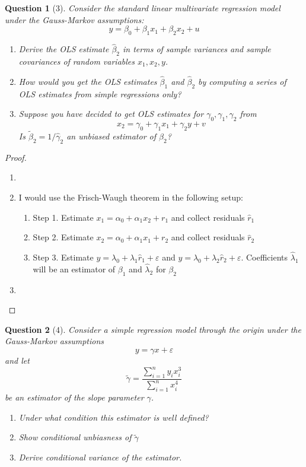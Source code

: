 \documentclass[12pt,reqno]{amsart}
\theoremstyle{plain}
\newcommand{\hb}{\hat\beta}
\newcommand{\tb}{\tilde\beta}
\newtheorem*{theorem*}{Question}
\begin{document}
\begin{theorem*}[3]
    \normalfont
    Consider the standard linear multivariate regression model under the Gauss-Markov assumptions:
    \[y = \beta_0 + \beta_1 x_{1} + \beta_{2}x_{2} + u \]
    \begin{enumerate}
        \item Derive the OLS estimate $ \hb_{2} $ in terms of sample variances and sample covariances of
              random variables $ x_{1}, x_{2}, y $.
        \item How would you get the OLS estimates $ \hb_{1} $ and $ \hb_{2} $ by computing a series of OLS estimates
              from simple regressions only?
        \item Suppose you have decided to get OLS estimates for $ \gamma_{0}, \gamma_{1}, \gamma_{2} $ from
              \[x_{2} = \gamma_{0} +\gamma_{1}x_{1} + \gamma_{2}y + v\]
              Is $ \tb_{2} = 1/\hat\gamma_{2} $ an unbiased estimator of $ \beta_{2} $?
    \end{enumerate}
\end{theorem*}
\begin{proof}
    \begin{enumerate}
        \item
        \item I would use the Frisch-Waugh theorem in the following setup:
              \begin{enumerate}
                  \item Step 1. Estimate $ x_1 = \alpha_0 + \alpha_{1}x_2 + r_1 $ and collect residuals $ \hat{r}_{1} $
                  \item Step 2. Estimate $ x_2 = \alpha_0 + \alpha_{1}x_1 + r_2 $ and collect residuals $ \hat{r}_{2} $
                  \item Step 3. Estimate $ y = \lambda_{0} + \lambda_{1}\hat{r}_{1} + \varepsilon $ and $ y = \lambda_{0} + \lambda_{2}\hat{r}_{2} + \varepsilon $.
                  Coefficients $ \hat\lambda_{1} $ will be an estimator of $ \beta_{1} $ and $ \hat\lambda_{2} $ for $ \beta_{2} $
              \end{enumerate}
        \item
    \end{enumerate}

\end{proof}
\begin{theorem*}[4]
    \normalfont
    Consider a simple regression model through the origin under the Gauss-Markov assumptions
    \[
        y = \gamma x + \varepsilon
    \]
    and let
    \[
        \tilde{\gamma} = \frac{\sum_{i=1}^{n} y_i x_i^{3}}{\sum_{i=1}^{n} x_{i}^{4}}
    \]
    be an estimator of the slope parameter $ \gamma $.
    \begin{enumerate}
        \item Under what condition this estimator is well defined?
        \item Show conditional unbiasness of $ \tilde\gamma $
        \item Derive conditional variance of the estimator.
    \end{enumerate}
\end{theorem*}
\end{document}
